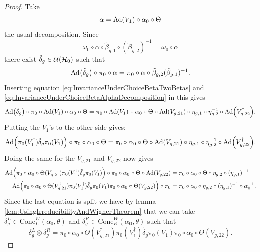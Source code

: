 \documentclass[12pt,a4paper,twoside]{article}
\numberwithin{equation}{section}
\begin{document}
\begin{proof}
	Take 
	\begin{equation}\label{eq:InvarianceUnderChoiceBetaAlphaDecomposition}
		\alpha=\Ad{V_1}\circ\alpha_{0}\circ\Theta
	\end{equation}
	the usual decomposition. Since
	\begin{equation}
		\omega_0\circ\alpha\circ\tilde{\beta}_{g,1}\circ(\tilde{\beta}_{g,2})^{-1}=\omega_0\circ\alpha
	\end{equation}
	there exist $\tilde{\delta}_g\in\mathcal U(\mathcal H_0)$ such that
	\begin{equation}
		\Ad{\tilde{\delta}_g}\circ\pi_0\circ\alpha=\pi_0\circ\alpha\circ\tilde{\beta}_{g,2}(\tilde{\beta}_{g,1})^{-1}.
	\end{equation}
	Inserting equation \eqref{eq:InvarianceUnderChoiceBetaTwoBetas} and \eqref{eq:InvarianceUnderChoiceBetaAlphaDecomposition} in this gives
	\begin{equation}
		\Ad{\tilde{\delta}_g}\circ\pi_0\circ\Ad{V_1}\circ\alpha_0\circ\Theta=\pi_0\circ\Ad{V_1}\circ\alpha_0\circ\Theta\circ\Ad{V_{g,21}}\circ\eta_{g,1}\circ\eta_{g,2}^{-1}\circ\Ad{V_{g,22}^\dagger}.
	\end{equation}
	Putting the $V_1$'s to the other side gives:
	\begin{equation}
		\Ad{\pi_0(V_1^\dagger) \tilde{\delta}_g\pi_0(V_1)}\circ\pi_0\circ\alpha_0\circ\Theta=\pi_0\circ\alpha_0\circ\Theta\circ\Ad{V_{g,21}}\circ\eta_{g,1}\circ\eta_{g,2}^{-1}\circ\Ad{V_{g,22}^\dagger}.
	\end{equation}
	Doing the same for the $V_{g,21}$ and $V_{g,22}$ now gives
	\begin{align}
		\Ad{\pi_0\circ\alpha_0\circ\Theta(V_{g,21}^\dagger)\pi_0(V_1^\dagger)\tilde{\delta}_g\pi_0(V_1)}\circ\pi_0\circ\alpha_0\circ\Theta\circ\Ad{V_{g,22}}&=\pi_0\circ\alpha_0\circ\Theta\circ\eta_{g,2}\circ(\eta_{g,1})^{-1}\\
		\Ad{\pi_0\circ\alpha_0\circ\Theta(V_{g,21}^\dagger)\pi_0(V_1^\dagger)\tilde{\delta}_g\pi_0(V_1)\pi_0\circ\alpha_0\circ\Theta(V_{g,22})}\circ\pi_0&=\pi_0\circ\alpha_0\circ\eta_{g,2}\circ(\eta_{g,1})^{-1}\circ\alpha_0^{-1}.
	\end{align}
	Since the last equation is split we have by lemma \ref{lem:UsingIrreducibilityAndWignerTheorem} that we can take $\delta_g^L\in\textrm{Cone}_L^W(\alpha_0,\theta)$ and $\delta_g^R\in\textrm{Cone}_R^W(\alpha_0,\theta)$ such that
	\begin{equation}
		\delta_g^L\otimes\delta_g^R=\pi_0\circ\alpha_0\circ\Theta(V_{g,21}^\dagger)\pi_0(V_1^\dagger)\tilde{\delta}_g\pi_0(V_1)\pi_0\circ\alpha_0\circ\Theta(V_{g,22}).

\end{equation}
\end{proof}
\end{document}
